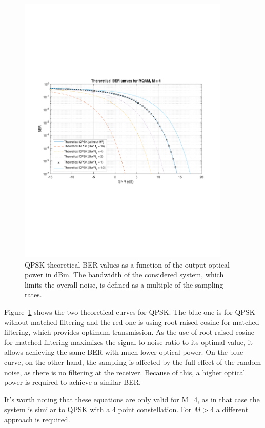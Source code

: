 \begin{refsection}
\begin{figure}[H]
	\centering
	\includegraphics[clip, trim=1cm 8cm 1cm 8cm, width=0.9\textwidth]{./sdf/m_qam_system/figures/teor_BER_curves.pdf}
	\caption{QPSK theoretical BER values as a function of the output optical power in dBm. The bandwidth of the considered system, which limits the overall noise, is defined as a multiple of the sampling rates.\label{fig:QPSK_th_curves}}
\end{figure}


Figure~\ref{fig:QPSK_th_curves} shows the two theoretical curves for QPSK. The
blue one is for QPSK without matched filtering and the red one is using
root-raised-cosine for matched filtering, which provides optimum transmission.
As the use of root-raised-cosine for matched filtering maximizes the
signal-to-noise ratio to its optimal value, it allows achieving the same BER
with much lower optical power. On the blue curve, on the other hand, the
sampling is affected by the full effect of the random noise, as there is no
filtering at the receiver. Because of this, a higher optical power is required
to achieve a similar BER.


It's worth noting that these equations are only valid for M=4, as in that case
the system is similar to QPSK with a 4 point constellation. For $M > 4$ a
different approach is required.


\end{refsection}
